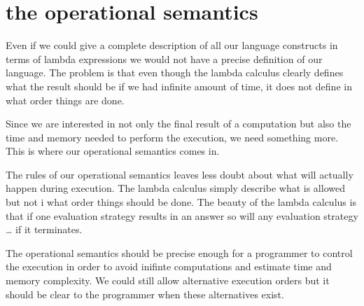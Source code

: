 \documentclass[a4paper,11pt]{article}
\begin{document}
\section{the operational semantics}

Even if we could give a complete description of all our language
constructs in terms of lambda expressions we would not have a precise
definition of our language. The problem is that even though the lambda
calculus clearly defines what the result should be if we had infinite
amount of time, it does not define in what order things are done.

Since we are interested in not only the final result of a computation
but also the time and memory needed to perform the execution, we need
something more. This is where our operational semantics comes in.

The rules of our operational semantics leaves less doubt about what
will actually happen during execution. The lambda calculus simply
describe what is allowed but not i what order things should be
done. The beauty of the lambda calculus is that if one evaluation
strategy results in an answer so will any evaluation strategy \ldots
if it terminates.

The operational semantics should be precise enough for a programmer to
control the execution in order to avoid inifinte computations and
estimate time and memory complexity. We could still allow alternative
execution orders but it should be clear to the programmer when these
alternatives exist.
\end{document}
